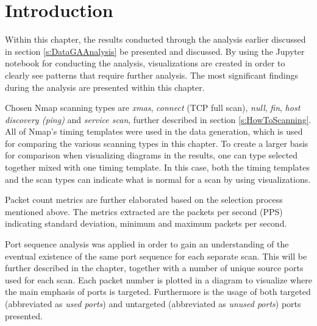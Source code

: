 \section{Introduction}
Within this chapter, the results conducted through the analysis earlier discussed in section \ref{s:DataGAAnalysis} be presented and discussed.
By using the Jupyter notebook for conducting the analysis, visualizations are created in order to clearly see patterns that require further analysis.
The most significant findings during the analysis are presented within this chapter.

Chosen Nmap scanning types are \textit{xmas}, \textit{connect} (TCP full scan), \textit{null}, \textit{fin}, \textit{host discovery (ping)} and \textit{service scan}, further described in section \ref{s:HowToScanning}.
All of Nmap's timing templates were used in the data generation, which is used for comparing the various scanning types in this chapter.
To create a larger basis for comparison when visualizing diagrams in the results, one can type selected together mixed with one timing template.
In this case, both the timing templates and the scan types can indicate what is normal for a scan by using visualizations.

Packet count metrics are further elaborated based on the selection process mentioned above.
The metrics extracted are the packets per second (PPS) indicating standard deviation, minimum and maximum packets per second.

Port sequence analysis was applied in order to gain an understanding of the eventual existence of the same port sequence for each separate scan.
This will be further described in the chapter, together with a number of unique source ports used for each scan.
Each packet number is plotted in a diagram to visualize where the main emphasis of ports is targeted.
Furthermore is the usage of both targeted (abbreviated as \textit{used ports}) and untargeted (abbreviated as \textit{unused ports}) ports presented.

